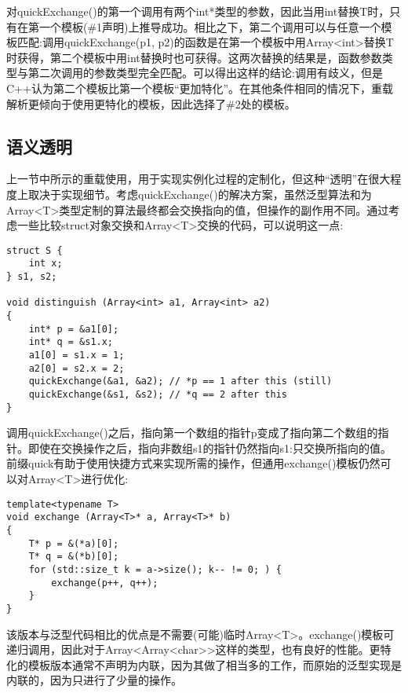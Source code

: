 对quickExchange()的第一个调用有两个int*类型的参数，因此当用int替换T时，只有在第一个模板(\#1声明)上推导成功。相比之下，第二个调用可以与任意一个模板匹配:调用quickExchange(p1, p2)的函数是在第一个模板中用Array<int>替换T时获得，第二个模板中用int替换时也可获得。这两次替换的结果是，函数参数类型与第二次调用的参数类型完全匹配。可以得出这样的结论:调用有歧义，但是C++认为第二个模板比第一个模板“更加特化”。在其他条件相同的情况下，重载解析更倾向于使用更特化的模板，因此选择了\#2处的模板。

\subsection{语义透明}

上一节中所示的重载使用，用于实现实例化过程的定制化，但这种“透明”在很大程度上取决于实现细节。考虑quickExchange()的解决方案，虽然泛型算法和为Array<T>类型定制的算法最终都会交换指向的值，但操作的副作用不同。通过考虑一些比较struct对象交换和Array<T>交换的代码，可以说明这一点:

\begin{lstlisting}[style=styleCXX]
struct S {
	int x;
} s1, s2;

void distinguish (Array<int> a1, Array<int> a2)
{
	int* p = &a1[0];
	int* q = &s1.x;
	a1[0] = s1.x = 1;
	a2[0] = s2.x = 2;
	quickExchange(&a1, &a2); // *p == 1 after this (still)
	quickExchange(&s1, &s2); // *q == 2 after this
}
\end{lstlisting}

调用quickExchange()之后，指向第一个数组的指针p变成了指向第二个数组的指针。即使在交换操作之后，指向非数组s1的指针仍然指向s1:只交换所指向的值。前缀quick有助于使用快捷方式来实现所需的操作，但通用exchange()模板仍然可以对Array<T>进行优化:

\begin{lstlisting}[style=styleCXX]
template<typename T>
void exchange (Array<T>* a, Array<T>* b)
{
	T* p = &(*a)[0];
	T* q = &(*b)[0];
	for (std::size_t k = a->size(); k-- != 0; ) {
		exchange(p++, q++);
	}
}
\end{lstlisting}

该版本与泛型代码相比的优点是不需要(可能)临时Array<T>。exchange()模板可递归调用，因此对于Array<Array<char>>这样的类型，也有良好的性能。更特化的模板版本通常不声明为内联，因为其做了相当多的工作，而原始的泛型实现是内联的，因为只进行了少量的操作。









